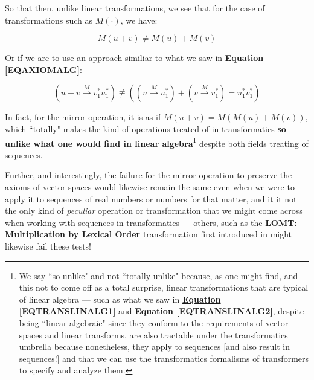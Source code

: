 \documentclass[a4paper, 18pt]{book} %
\begin{document}
\begin{appendices}
\vspace{2em}

So that then, unlike linear transformations, we see that for the case of transformations such as $M(\cdot)$, we have:

\vspace{2em}

\begin{equation}
M(u + v) \neq M(u) + M(v) 
\end{equation}

\vspace{2em}

Or if we are to use an approach similiar to what we saw in \textbf{\hyperref[EQAXIOMALG]{Equation \ref{EQAXIOMALG}}}:

\vspace{2em}

\begin{equation}
\label{EQAXIOMMIRROR}
(u + v \xrightarrow{M} v^*_1u^*_1) \not\equiv ((u \xrightarrow{M} u^*_1) + (v \xrightarrow{M} v^*_1) =  u^*_1v^*_1)
\end{equation}

\vspace{2em}

In fact, for the mirror operation, it is as if $M(u + v) = M(M(u) + M(v))$, which ``totally" makes the kind of operations treated of in transformatics \textbf{so unlike what one would find in linear algebra}\footnote{We say ``so unlike" and not ``totally unlike" because, as one might find, and this not to come off as a total surprise, linear transformations that are typical of linear algebra --- such as what we saw in \textbf{\hyperref[EQTRANSLINALG1]{Equation \ref{EQTRANSLINALG1}}} and \textbf{\hyperref[EQTRANSLINALG2]{Equation \ref{EQTRANSLINALG2}}}, despite being ``linear algebraic" since they conform to the requirements of vector spaces and linear transforms, are also tractable under the transformatics umbrella because nonetheless, they apply to sequences [and also result in sequences!] and that we can use the transformatics formalisms of transformers to specify and analyze them.} despite both fields treating of sequences.

\vspace{2em}

Further, and interestingly, the failure for the mirror operation to preserve the axioms of vector spaces would likewise remain the same even when we were to apply it to sequences of real numbers or numbers for that matter, and it it not the only kind of \textit{peculiar} operation or transformation that we might come across when working with sequences in transformatics --- others, such as the \textbf{LOMT: Multiplication by Lexical Order} transformation first introduced in \cite{transformatics} might likewise fail these tests!



\end{appendices}
\end{document}
